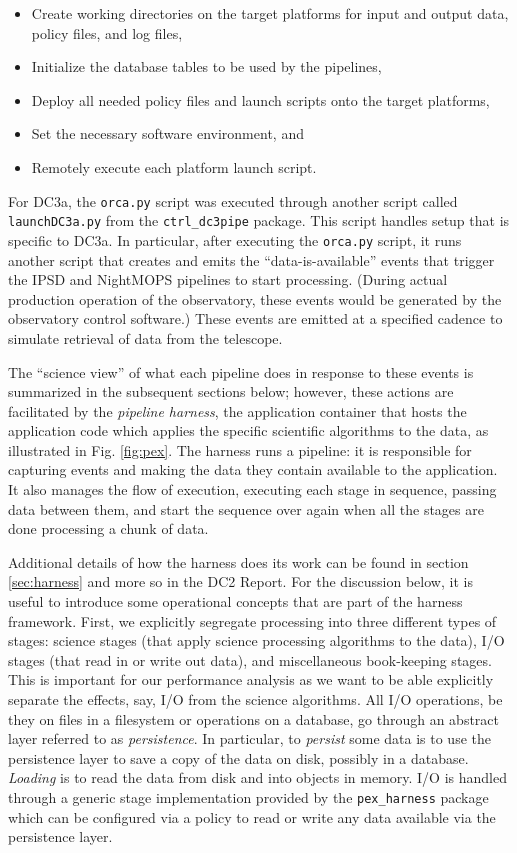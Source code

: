 \begin{itemize}
\item Create working directories on the target platforms for input and
  output data, policy files, and log files,
\item Initialize the database tables to be used by the pipelines, 
\item Deploy all needed policy files and launch scripts onto the
  target platforms,
\item Set the necessary software environment, and 
\item Remotely execute each platform launch script.
\end{itemize}

For DC3a, the \texttt{orca.py} script was executed through another
script called \texttt{launchDC3a.py} from the \texttt{ctrl\_dc3pipe}
package.  This script handles setup that is specific to DC3a.  In
particular, after executing the \texttt{orca.py} script, it runs
another script that creates and emits the ``data-is-available'' events
that trigger the IPSD and NightMOPS pipelines to start processing.
(During actual production operation of the observatory, these events
would be generated by the observatory control software.)  These events
are emitted at a specified cadence to simulate retrieval of data from
the telescope.  

The ``science view'' of what each pipeline does in response to these
events is summarized in the subsequent sections below; however, these
actions are facilitated by the \textit{pipeline harness}, the
application container that hosts the application code which applies
the specific scientific algorithms to the data, as illustrated in
Fig. \ref{fig:pex}.  The harness runs a pipeline: it is responsible
for capturing events and making the data they contain available to the
application.  It also manages the flow of execution, executing each
stage in sequence, passing data between them, and start the sequence
over again when all the stages are done processing a chunk of data.  

Additional details of how the harness does its work can be found in
section \ref{sec:harness} and more so in the DC2 Report.  For the
discussion below, it is useful to introduce some operational concepts
that are part of the harness framework.  First, we explicitly
segregate processing into three different types of stages:  science
stages (that apply science processing algorithms to the data), I/O
stages (that read in or write out data), and miscellaneous
book-keeping stages.  This is important for our performance analysis
as we want to be able explicitly separate the effects, say, I/O from
the science algorithms.  All I/O operations, be they on files in a
filesystem or operations on a database, go through an abstract
layer referred to as \textit{persistence}.  In particular, to
\textit{persist} some data is to use the persistence layer to save a
copy of the data on disk, possibly in a database.  \textit{Loading} is to
read the data from disk and into objects in memory.  I/O is handled
through a generic stage implementation provided by the
\texttt{pex\_harness} package which can be configured via a policy to
read or write any data available via the persistence layer.  

